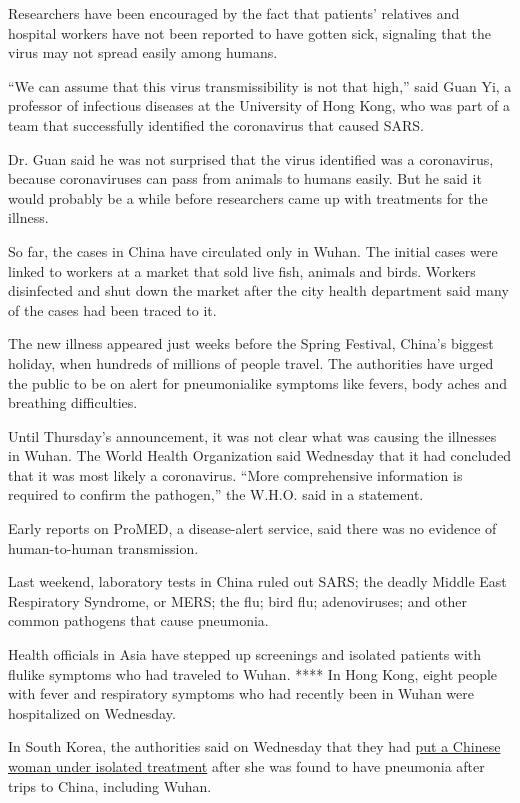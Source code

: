 Researchers have been encouraged by the fact that patients' relatives
and hospital workers have not been reported to have gotten sick,
signaling that the virus may not spread easily among humans.

``We can assume that this virus transmissibility is not that high,''
said Guan Yi, a professor of infectious diseases at the University of
Hong Kong, who was part of a team that successfully identified the
coronavirus that caused SARS.

Dr. Guan said he was not surprised that the virus identified was a
coronavirus, because coronaviruses can pass from animals to humans
easily. But he said it would probably be a while before researchers came
up with treatments for the illness.

So far, the cases in China have circulated only in Wuhan. The initial
cases were linked to workers at a market that sold live fish, animals
and birds. Workers disinfected and shut down the market after the city
health department said many of the cases had been traced to it.

The new illness appeared just weeks before the Spring Festival, China's
biggest holiday, when hundreds of millions of people travel. The
authorities have urged the public to be on alert for pneumonialike
symptoms like fevers, body aches and breathing difficulties.

Until Thursday's announcement, it was not clear what was causing the
illnesses in Wuhan. The World Health Organization said Wednesday that it
had concluded that it was most likely a coronavirus. ``More
comprehensive information is required to confirm the pathogen,'' the
W.H.O. said in a statement.

Early reports on ProMED, a disease-alert service, said there was no
evidence of human-to-human transmission.

Last weekend, laboratory tests in China ruled out SARS; the deadly
Middle East Respiratory Syndrome, or MERS; the flu; bird flu;
adenoviruses; and other common pathogens that cause pneumonia.

Health officials in Asia have stepped up screenings and isolated
patients with flulike symptoms who had traveled to Wuhan. **** In Hong
Kong, eight people with fever and respiratory symptoms who had recently
been in Wuhan were hospitalized on Wednesday.

In South Korea, the authorities said on Wednesday that they had
\href{https://www.scmp.com/news/asia/east-asia/article/3045249/chinese-worker-who-visited-wuhan-quarantined-south-korea}{put
a Chinese woman under isolated treatment} after she was found to have
pneumonia after trips to China, including Wuhan.

